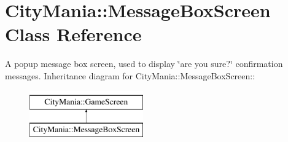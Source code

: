 \hypertarget{classCityMania_1_1MessageBoxScreen}{
\section{CityMania::MessageBoxScreen Class Reference}
\label{classCityMania_1_1MessageBoxScreen}
}


A popup message box screen, used to display \char`\"{}are you sure?\char`\"{} confirmation messages.  
Inheritance diagram for CityMania::MessageBoxScreen::\begin{figure}[H]
\begin{center}
\leavevmode
\includegraphics[height=2cm]{classCityMania_1_1MessageBoxScreen}
\end{center}
\end{figure}
